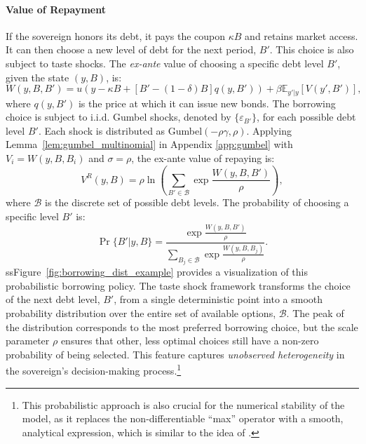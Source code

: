 \documentclass[12pt]{article}
\theoremstyle{plain}
\begin{document}
\paragraph{Value of Repayment }
If the sovereign honors its debt, it pays the coupon $\kappa B$ and retains
market access. It can then choose a new level of debt for the next period,
$B'$. This choice is also subject to taste shocks. The \emph{ex-ante} value of
choosing a specific debt level $B'$, given the state $(y, B)$, is:
\begin{equation}
	W(y, B, B') = u\left(y - \kappa B + \left[B' - (1-\delta)B\right] q(y, B')\right) + \beta \mathbb{E}_{y'|y} \left[V(y', B')\right],
\end{equation}
where $q(y, B')$ is the price at which it can issue new bonds. The borrowing choice is subject to i.i.d. Gumbel shocks, denoted by
$\{\varepsilon_{B'}\}$, for each possible debt level $B'$. Each shock is
distributed as Gumbel$(-\rho\gamma, \rho)$. Applying Lemma~\ref{lem:gumbel_multinomial} in Appendix \ref{app:gumbel} with $V_i = W(y, B, B_i)$ and
$\sigma = \rho$, the ex-ante value of repaying is:
\begin{equation}\label{eq:Vr}
	V^R(y, B) = \rho \ln\left( \sum_{B' \in \mathcal{B}} \exp\frac{W(y, B, B')}{\rho} \right),
\end{equation}
where $\mathcal{B}$ is the discrete set of possible debt levels. The probability of choosing a specific level $B'$ is:
\begin{equation}
	\Pr\{B' | y, B\} = \frac{\exp\frac{W(y, B, B')}{\rho}}{\sum_{B_j \in \mathcal{B}}\exp\frac{W(y, B, B_j)}{\rho}}.
\end{equation}
ssFigure~\ref{fig:borrowing_dist_example} provides a visualization of this
probabilistic borrowing policy. The taste shock framework transforms the choice
of the next debt level, $B'$, from a single deterministic point into a smooth
probability distribution over the entire set of available options,
$\mathcal{B}$. The peak of the distribution corresponds to the most preferred
borrowing choice, but the scale parameter $\rho$ ensures that other, less
optimal choices still have a non-zero probability of being selected. This
feature captures \textit{unobserved heterogeneity} in the sovereign's
decision-making process.\footnote{This probabilistic approach is also crucial
	for the numerical stability of the model, as it replaces the non-differentiable
	``max'' operator with a smooth, analytical expression, which is similar to the idea of \citep{ChatterjeeEyigungor2012}.}
\end{document}
